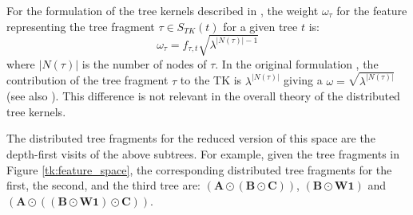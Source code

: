 \documentclass[twoside,11pt]{article}
\def\vec#1{\mathbf{#1}}
\def\svec#1{\vec{#1}}
\def\mynodes#1{N(#1)}
\def\nnodes#1{|\mynodes{#1}|}
\def\num#1#2{f_{#1,#2}}
\def\mo{\odot}
\begin{document}
For the formulation of the tree kernels described in \cite{Zanzotto2012193}, the weight $\omega_{\tau}$ for the feature representing the tree fragment $\tau \in S_{TK}(t)$ for a given tree $t$ is:
\begin{displaymath}
\omega_{\tau}= \num{\tau}{t}\sqrt{\lambda^{\nnodes{\tau}-1}}
\end{displaymath}
where $\nnodes{\tau}$ is the number of nodes of $\tau$. In the original formulation \cite{DBLP:conf/nips/CollinsD01}, the contribution 
of the tree fragment $\tau$ to the TK is $\lambda^{\nnodes{\tau}}$ giving a $\omega = \sqrt{\lambda^{\nnodes{\tau}}}$ (see also \cite{Pighin:Moschitti:conll:2010}). This difference is not relevant in the overall theory of the distributed tree kernels.



The distributed tree fragments for the reduced version of this space are the depth-first visits of the above subtrees. For example, given the tree fragments in Figure \ref{tk:feature_space}, the corresponding distributed tree fragments for the first, the second, and the third tree are: $(\svec{A}\mo(\svec{B}\mo\svec{C}))$, $(\svec{B}\mo\svec{W1})$ and $(\svec{A}\mo((\svec{B}\mo\svec{W1})\mo\svec{C}))$.












\end{document}
